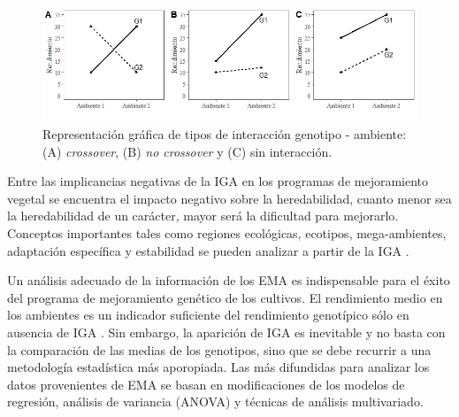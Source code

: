 \begin{figure}[h]
\begin{center}
\includegraphics[width=14cm]{./Graficos/interac}
\end{center}
\caption{  Representación gráfica de tipos de interacción genotipo - ambiente: (A) \emph{crossover}, (B) \emph{no crossover} y (C) sin interacción.}
\label{fig:fig11}
\end{figure}


Entre las implicancias negativas de la IGA en los programas de mejoramiento vegetal se encuentra el impacto negativo sobre la heredabilidad, cuanto menor sea la heredabilidad de un carácter, mayor será la dificultad para mejorarlo. Conceptos importantes tales como regiones ecológicas, ecotipos, mega-ambientes, adaptación específica y estabilidad se pueden analizar a partir de la IGA \citep{YanHunt2001}.

Un análisis adecuado de la información de los EMA es indispensable para el éxito del programa de mejoramiento genético de los cultivos. El rendimiento medio en los ambientes es un indicador suficiente del rendimiento genotípico sólo en ausencia de IGA \citep{YanKang2003}. Sin embargo, la aparición de IGA es inevitable y no basta con la comparación de las medias de los genotipos, sino que se debe recurrir a una metodología estadística más aporopiada. Las más difundidas para analizar los datos provenientes de EMA se basan en modificaciones de los modelos de regresión, análisis de variancia (ANOVA) y técnicas de análisis multivariado. 

